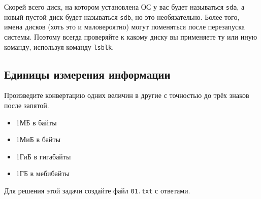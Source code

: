 \documentclass{article}
\begin{document}
\begin{itemize}
Скорей всего диск, на котором установлена ОС у вас будет называться \texttt{sda}, а новый пустой диск будет называться \texttt{sdb}, но это необязательно. Более того, имена дисков (хоть это и маловероятно) могут поменяться после перезапуска системы. Поэтому всегда проверяйте к какому диску вы применяете ту или иную команду, используя команду \texttt{lsblk}.




\end{itemize}



\newpage


\subsection{Единицы измерения информации}
Произведите конвертацию одних величин в другие с точностью до трёх знаков после запятой.
\begin{itemize}
\item 1МБ в байты
\item 1МиБ в байты
\item 1ГиБ в гигабайты
\item 1ГБ в мебибайты
\end{itemize}
Для решения этой задачи создайте файл \texttt{01.txt} с ответами.
\end{document}
